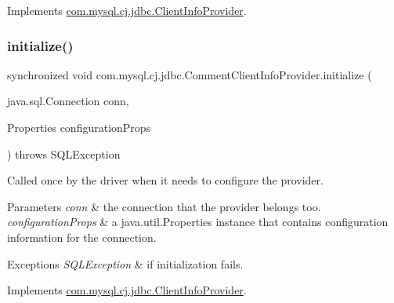Implements \mbox{\hyperlink{interfacecom_1_1mysql_1_1cj_1_1jdbc_1_1_client_info_provider_a0447982e2a9eeec5776288384f7db3c1}{com.\+mysql.\+cj.\+jdbc.\+Client\+Info\+Provider}}.

\mbox{\label{classcom_1_1mysql_1_1cj_1_1jdbc_1_1_comment_client_info_provider_a97c8c3819905e4745f248350c01dd479}} 
\subsubsection{\texorpdfstring{initialize()}{initialize()}}
{\footnotesize\ttfamily synchronized void com.\+mysql.\+cj.\+jdbc.\+Comment\+Client\+Info\+Provider.\+initialize (\begin{DoxyParamCaption}\item[{java.\+sql.\+Connection}]{conn,  }\item[{Properties}]{configuration\+Props }\end{DoxyParamCaption}) throws S\+Q\+L\+Exception}

Called once by the driver when it needs to configure the provider.


\begin{DoxyParams}{Parameters}
{\em conn} & the connection that the provider belongs too. \\
\hline
{\em configuration\+Props} & a java.\+util.\+Properties instance that contains configuration information for the connection. \\
\hline
\end{DoxyParams}

\begin{DoxyExceptions}{Exceptions}
{\em S\+Q\+L\+Exception} & if initialization fails. \\
\hline
\end{DoxyExceptions}


Implements \mbox{\hyperlink{interfacecom_1_1mysql_1_1cj_1_1jdbc_1_1_client_info_provider_aacf1104fd90e2c5b1ca940d63e884cf6}{com.\+mysql.\+cj.\+jdbc.\+Client\+Info\+Provider}}.

\mbox{\label{classcom_1_1mysql_1_1cj_1_1jdbc_1_1_comment_client_info_provider_a7bcec16d4a0597f7912dd99db90018c1}} 
